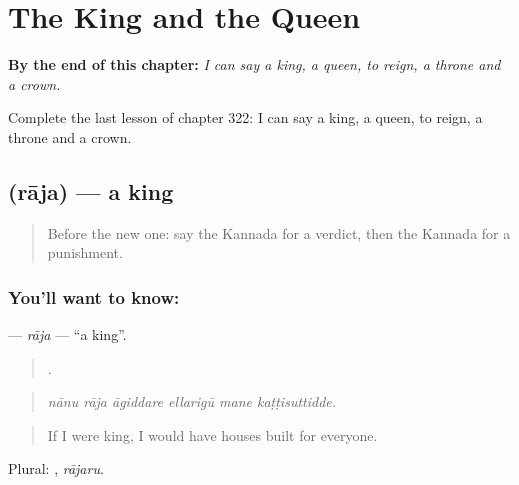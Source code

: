 
\chapter{The King and the Queen}
\label{ch:ka-the-king-and-the-queen}

\begin{chapteropening}
\textbf{By the end of this chapter:} \emph{I can say a king, a queen, to reign, a throne and a crown.}

Complete the last lesson of chapter 322: I can say a king, a queen, to reign, a throne and a crown.
\end{chapteropening}

\section[\texorpdfstring{\kn{ರಾಜ} (rāja)}{ರಾಜ (rāja)}]{ (rāja) — a king}

\label{lesson:KA-C322-raja}



\begin{quote}
Before the new one: say the Kannada for a verdict, then the Kannada for a punishment.
\end{quote}

\subsection*{You'll want to know: }
\textbf{} — \emph{rāja} — \textquotedblleft{}a king\textquotedblright{}.

\begin{quote}
     .
\end{quote}

\begin{quote}
\emph{nānu rāja āgiddare ellarigū mane kaṭṭisuttidde.}
\end{quote}

\begin{quote}
If I were king, I would have houses built for everyone.
\end{quote}

Plural: , \emph{rājaru}.

